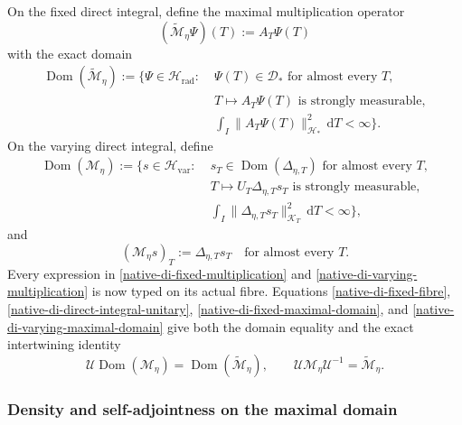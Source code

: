 On the fixed direct integral, define the maximal multiplication operator
\begin{equation}
 (\widetilde{\mathscr M}_\eta\Psi)(T):=A_T\Psi(T)
\label{native-di-fixed-multiplication}
\end{equation}
with the exact domain
\begin{equation}
\begin{split}
 \operatorname{Dom}(\widetilde{\mathscr M}_\eta)
 :=\{\Psi\in\mathscr H_{\mathrm{rad}}:\;&
 \Psi(T)\in\mathscr D_*\text{ for almost every }T,\\
 &T\mapsto A_T\Psi(T)\text{ is strongly measurable},\\
 &\int_I\|A_T\Psi(T)\|_{\mathscr H_*}^2\,\mathrm d T<\infty\}.
\end{split}
\label{native-di-fixed-maximal-domain}
\end{equation}
On the varying direct integral, define
\begin{equation}
\begin{split}
 \operatorname{Dom}(\mathscr M_\eta)
 :=\{s\in\mathscr H_{\mathrm{var}}:\;&
 s_T\in\operatorname{Dom}(\Delta_{\eta,T})\text{ for almost every }T,\\
 &T\mapsto U_T\Delta_{\eta,T}s_T
       \text{ is strongly measurable},\\
 &\int_I\|\Delta_{\eta,T}s_T\|_{\mathscr K_T}^2\,\mathrm d T<\infty\},
\end{split}
\label{native-di-varying-maximal-domain}
\end{equation}
and
\begin{equation}
 (\mathscr M_\eta s)_T:=\Delta_{\eta,T}s_T
 \quad\text{for almost every }T.
\label{native-di-varying-multiplication}
\end{equation}
Every expression in \eqref{native-di-fixed-multiplication} and
\eqref{native-di-varying-multiplication} is now typed on its actual fibre.
Equations \eqref{native-di-fixed-fibre},
\eqref{native-di-direct-integral-unitary},
\eqref{native-di-fixed-maximal-domain}, and
\eqref{native-di-varying-maximal-domain} give both the domain equality and
the exact intertwining identity
\begin{equation}
 \mathscr U\operatorname{Dom}(\mathscr M_\eta)
 =\operatorname{Dom}(\widetilde{\mathscr M}_\eta),
 \qquad
 \mathscr U\mathscr M_\eta\mathscr U^{-1}
 =\widetilde{\mathscr M}_\eta.
\label{native-di-intertwining}
\end{equation}

\subsubsection{Density and self-adjointness on the maximal domain}

